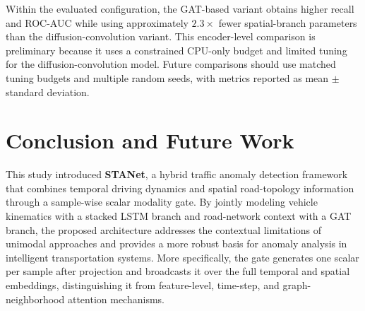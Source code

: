 \documentclass[journal]{IEEEtran}
\begin{document}
\begin{table}[!htbp]
  \centering
  \caption{Preliminary single-run comparison of STANet and a diffusion-convolution spatial-encoder variant}
  \label{tab:diffusion_comparison}
  \renewcommand{\arraystretch}{1.15}
\end{table}

Within the evaluated configuration, the GAT-based variant obtains higher recall and ROC-AUC while using approximately $2.3\times$ fewer spatial-branch parameters than the diffusion-convolution variant. This encoder-level comparison is preliminary because it uses a constrained CPU-only budget and limited tuning for the diffusion-convolution model. Future comparisons should use matched tuning budgets and multiple random seeds, with metrics reported as mean $\pm$ standard deviation.

\FloatBarrier
\section{Conclusion and Future Work}

This study introduced \textbf{STANet}, a hybrid traffic anomaly detection framework that combines temporal driving dynamics and spatial road-topology information through a sample-wise scalar modality gate. By jointly modeling vehicle kinematics with a stacked LSTM branch and road-network context with a GAT branch, the proposed architecture addresses the contextual limitations of unimodal approaches and provides a more robust basis for anomaly analysis in intelligent transportation systems. More specifically, the gate generates one scalar per sample after projection and broadcasts it over the full temporal and spatial embeddings, distinguishing it from feature-level, time-step, and graph-neighborhood attention mechanisms.
\end{document}

